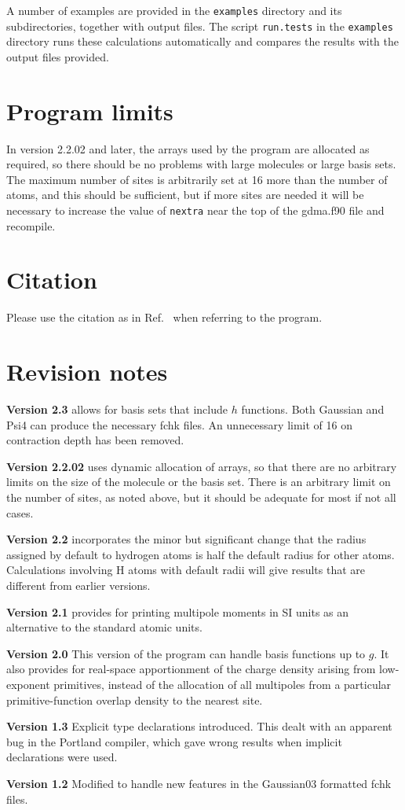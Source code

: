 \documentclass[12pt,txfonts]{paper}
\begin{document}
A number of examples are provided in the \verb/examples/ directory and
its subdirectories, together with output files. The script
\verb/run.tests/ in the \verb/examples/ directory runs these
calculations automatically and compares the results with the output
files provided. 

\section{Program limits}

In version 2.2.02 and later, the arrays used by the program are allocated as
required, so there should be no problems with large molecules or large
basis sets. The maximum number of sites is arbitrarily set at 16 more
than the number of atoms, and this should be sufficient, but if more
sites are needed it will be necessary to increase the value of
\texttt{nextra} near the top of the gdma.f90 file and recompile.


\section{Citation}

Please use the citation as in Ref.~ when referring
to the program.


\section{Revision notes}

\textbf{Version 2.3} allows for basis sets that include $h$
functions. Both Gaussian and Psi4 can produce the necessary fchk
files. An unnecessary limit of 16 on contraction depth has been
removed.

\textbf{Version 2.2.02} uses dynamic allocation of arrays, so that
there are no arbitrary limits on the size of the molecule or the basis
set. There is an arbitrary limit on the number of sites, as noted
above, but it should be adequate for most if not all cases.

\textbf{Version 2.2} incorporates the minor but significant change
that the radius assigned by default to hydrogen atoms is half the default
radius for other atoms. Calculations involving H atoms with default
radii will give results that are different from earlier versions.

\textbf{Version 2.1} provides for printing multipole moments in SI
units as an alternative to the standard atomic units.

\textbf{Version 2.0} This version of the program can handle basis
functions up to $g$. It also provides for real-space apportionment
of the charge density arising from low-exponent primitives, instead
of the allocation of all multipoles from a particular
primitive-function overlap density to the nearest site.

\textbf{Version 1.3} Explicit type declarations introduced. This dealt
with an apparent bug in the Portland compiler, which gave wrong
results when implicit declarations were used.

\textbf{Version 1.2} Modified to handle new features in the Gaussian03
formatted fchk files.

\pagebreak

\end{document}
